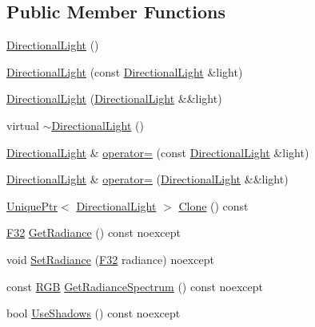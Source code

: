 \subsection*{Public Member Functions}
\begin{DoxyCompactItemize}
\item 
\hyperlink{classmage_1_1_directional_light_aa773f5b1f922b300ec91c0f7fa064b68}{Directional\+Light} ()
\item 
\hyperlink{classmage_1_1_directional_light_a777b1b8e00a51ba84f6af774a7b519ea}{Directional\+Light} (const \hyperlink{classmage_1_1_directional_light}{Directional\+Light} \&light)
\item 
\hyperlink{classmage_1_1_directional_light_a9563b260b550057e951500c40ecbe2d3}{Directional\+Light} (\hyperlink{classmage_1_1_directional_light}{Directional\+Light} \&\&light)
\item 
virtual \hyperlink{classmage_1_1_directional_light_a967d33c11a1477c01ce4c9720337caeb}{$\sim$\+Directional\+Light} ()
\item 
\hyperlink{classmage_1_1_directional_light}{Directional\+Light} \& \hyperlink{classmage_1_1_directional_light_a371d3c13d6e59c8d105da058b460874d}{operator=} (const \hyperlink{classmage_1_1_directional_light}{Directional\+Light} \&light)
\item 
\hyperlink{classmage_1_1_directional_light}{Directional\+Light} \& \hyperlink{classmage_1_1_directional_light_a508b595bf6aa5fc9db53e0a854fda41d}{operator=} (\hyperlink{classmage_1_1_directional_light}{Directional\+Light} \&\&light)
\item 
\hyperlink{namespacemage_a3316d7143a973e37adf1110f2e80ca31}{Unique\+Ptr}$<$ \hyperlink{classmage_1_1_directional_light}{Directional\+Light} $>$ \hyperlink{classmage_1_1_directional_light_a779c49e066215cff9f80ed40048dfc62}{Clone} () const
\item 
\hyperlink{namespacemage_aa97e833b45f06d60a0a9c4fc22ae02c0}{F32} \hyperlink{classmage_1_1_directional_light_a73fe73ce8184bf32379ead1e00b34c9f}{Get\+Radiance} () const noexcept
\item 
void \hyperlink{classmage_1_1_directional_light_ac8b63948d393696ca8745c799328be84}{Set\+Radiance} (\hyperlink{namespacemage_aa97e833b45f06d60a0a9c4fc22ae02c0}{F32} radiance) noexcept
\item 
const \hyperlink{structmage_1_1_r_g_b}{R\+GB} \hyperlink{classmage_1_1_directional_light_a137cef14d20df2c907884a04ae2019ff}{Get\+Radiance\+Spectrum} () const noexcept
\item 
bool \hyperlink{classmage_1_1_directional_light_a645e7f3d3e4dc4ebf11d7a6aa6950a18}{Use\+Shadows} () const noexcept

\end{DoxyCompactItemize}
